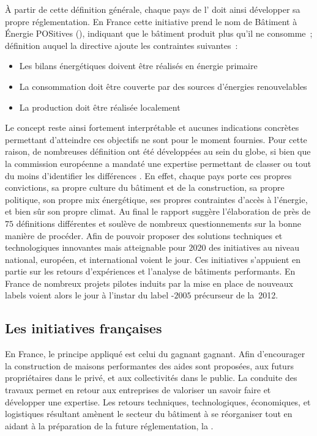 À partir de cette définition générale, chaque pays de l’ doit ainsi développer sa
propre réglementation. En France cette initiative prend le nom de Bâtiment à
Énergie POSitives (), indiquant que le bâtiment produit plus qu’il ne consomme~; définition
auquel la directive ajoute les contraintes suivantes~:
\begin{itemize}
    \item Les bilans énergétiques doivent être réalisés en énergie primaire
    \item La consommation doit être couverte par des sources d’énergies renouvelables
    \item La production doit être réalisée localement
\end{itemize}
Le concept reste ainsi fortement interprétable et aucunes indications concrètes
permettant d’atteindre ces objectifs ne sont pour le moment fournies.
Pour cette raison, de nombreuses définition ont été développées au sein du globe,
si bien que la commission européenne a mandaté une expertise permettant de classer ou
tout du moins d’identifier les différences \parencite{ECOFYS2013}. En effet, chaque pays
porte ces propres convictions, sa propre culture du bâtiment et de la construction, sa
propre politique, son propre mix énergétique, ses propres contraintes d’accès à l’énergie,
et bien sûr son propre climat.
Au final le rapport suggère l’élaboration de près de $75$ définitions différentes et
soulève de nombreux questionnements sur la bonne manière de procéder. Afin de pouvoir
proposer des solutions techniques et technologiques innovantes mais atteignable pour
$2020$ des initiatives au niveau national, européen, et international voient le jour.
Ces initiatives s’appuient en partie sur les retours d’expériences et l’analyse de bâtiments
performants. En France de nombreux projets pilotes induits par la mise
en place de nouveaux labels voient alors le jour à l’instar du label -$2005$
précurseur de la \,2012.


\subsection{Les initiatives françaises} %
\label{sub:les_initiatives_francaises}
En France, le principe appliqué est celui du gagnant gagnant. Afin d’encourager la
construction de maisons performantes des aides sont proposées, aux futurs propriétaires
dans le privé, et aux collectivités dans le public. La conduite des travaux permet en retour aux entreprises de valoriser un
savoir faire et développer une expertise. Les retours techniques, technologiques,
économiques, et logistiques résultant amènent le secteur du bâtiment à se réorganiser tout
en aidant à la préparation de la future réglementation, la .

